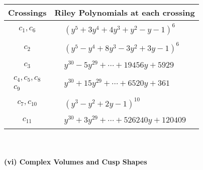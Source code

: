\documentclass[1p]{elsarticle_modified}
\theoremstyle{definition}
\begin{document}
\begin{tabular}{m{50pt}|m{274pt}}
Crossings & \hspace{64pt}Riley Polynomials at each crossing \\
\hline $$\begin{aligned}c_{1},c_{6}\end{aligned}$$&$\begin{aligned}
&(y^5+3 y^4+4 y^3+y^2- y-1)^6
\end{aligned}$\\
\hline $$\begin{aligned}c_{2}\end{aligned}$$&$\begin{aligned}
&(y^5- y^4+8 y^3-3 y^2+3 y-1)^6
\end{aligned}$\\
\hline $$\begin{aligned}c_{3}\end{aligned}$$&$\begin{aligned}
&y^{30}-5 y^{29}+\cdots+19456 y+5929
\end{aligned}$\\
\hline $$\begin{aligned}c_{4},c_{5},c_{8}\\c_{9}\end{aligned}$$&$\begin{aligned}
&y^{30}+15 y^{29}+\cdots+6520 y+361
\end{aligned}$\\
\hline $$\begin{aligned}c_{7},c_{10}\end{aligned}$$&$\begin{aligned}
&(y^3- y^2+2 y-1)^{10}
\end{aligned}$\\
\hline $$\begin{aligned}c_{11}\end{aligned}$$&$\begin{aligned}
&y^{30}+3 y^{29}+\cdots+526240 y+120409
\end{aligned}$\\
\hline
\end{tabular}\\~\\
\newpage\flushleft \textbf{(vi) Complex Volumes and Cusp Shapes}
\end{document}
